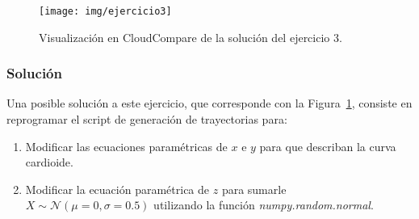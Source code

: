 \documentclass[]{article}
\begin{document}
	\begin{figure}[htb]
		\centering
		\texttt{[image: img/ejercicio3]}
		\caption{Visualización en CloudCompare de la solución del ejercicio 3.}
		\label{fig:ejercicio3}
	\end{figure} 

	\subsubsection*{Solución}
	Una posible solución a este ejercicio, que corresponde con la Figura~\ref{fig:ejercicio3}, consiste en reprogramar el script de generación de trayectorias para:
	
	\begin{enumerate}
		\item Modificar las ecuaciones paramétricas de $x$ e $y$ para que describan la curva cardioide.
		\item Modificar la ecuación paramétrica de $z$ para sumarle $X \sim \mathcal{N}(\mu=0, \sigma=0.5)$ utilizando la función \textit{numpy.random.normal}.
	\end{enumerate}
\end{document}
